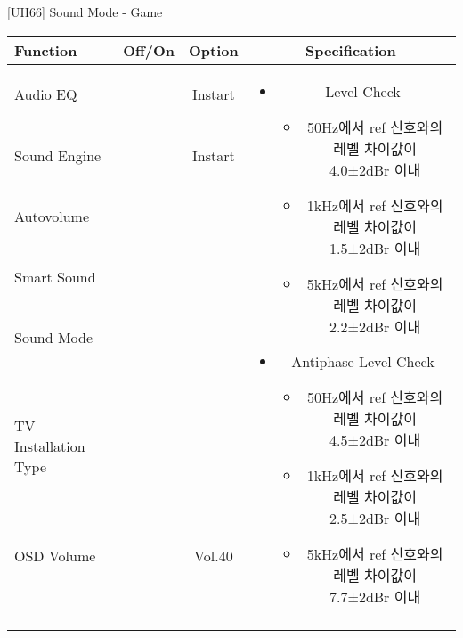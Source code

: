 \begin{frame}[t]{[UH66] Sound Mode - Game}
\begin{tiny}
\begin{tabular}{@{}lccc@{}}
\toprule
Function & Off/On & Option & Specification \\
\midrule
Audio EQ & \color{black}{Off} & Instart &
\multirow{10}{60mm}{
\begin{itemize}
\item Level Check
  \begin{itemize}
  \item 50Hz에서 ref 신호와의 레벨 차이값이 4.0±2dBr 이내
  \item 1kHz에서 ref 신호와의 레벨 차이값이 1.5±2dBr 이내
  \item 5kHz에서 ref 신호와의 레벨 차이값이 2.2±2dBr 이내
  \end{itemize}
\item Antiphase Level Check
  \begin{itemize}
  \item 50Hz에서 ref 신호와의 레벨 차이값이 4.5±2dBr 이내
  \item 1kHz에서 ref 신호와의 레벨 차이값이 2.5±2dBr 이내
  \item 5kHz에서 ref 신호와의 레벨 차이값이 7.7±2dBr 이내
  \end{itemize}
\end{itemize}
} \\
Sound Engine & \color{blue}{On} & Instart & \\
Autovolume & \color{black}{Off} & & \\
Smart Sound & \color{black}{Off} & & \\
Sound Mode & \color{blue}{On} & \color{blue}{Game} & \\
TV Installation Type & \color{blue}{On} & \color{black}{Standtype1} & \\
OSD Volume & \color{blue}{On} & Vol.40 & \\
& & & \\
& & & \\
& & & \\
& & & \\
\midrule
\end{tabular}
\end{tiny}

\end{frame}
